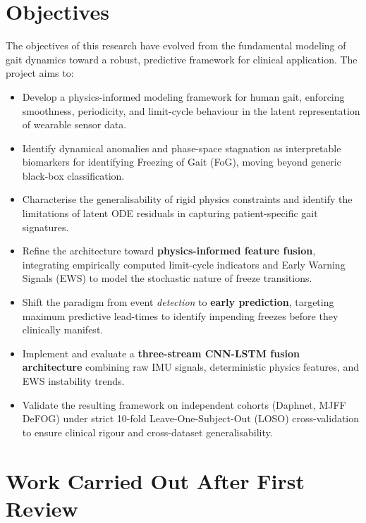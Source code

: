 \documentclass[12pt,a4paper]{article}
\begin{document}
\section*{Objectives}

The objectives of this research have evolved from the fundamental modeling of gait dynamics
toward a robust, predictive framework for clinical application. The project aims to:

\begin{itemize}[leftmargin=*, itemsep=4pt]
  \item Develop a physics-informed modeling framework for human gait, enforcing smoothness,
        periodicity, and limit-cycle behaviour in the latent representation of wearable sensor
        data.
  \item Identify dynamical anomalies and phase-space stagnation as interpretable biomarkers for
        identifying Freezing of Gait (FoG), moving beyond generic black-box classification.
  \item Characterise the generalisability of rigid physics constraints and identify the
        limitations of latent ODE residuals in capturing patient-specific gait signatures.
  \item Refine the architecture toward \textbf{physics-informed feature fusion}, integrating
        empirically computed limit-cycle indicators and Early Warning Signals (EWS) to model
        the stochastic nature of freeze transitions.
  \item Shift the paradigm from event \emph{detection} to \textbf{early prediction}, targeting
        maximum predictive lead-times to identify impending freezes before they clinically
        manifest.
  \item Implement and evaluate a \textbf{three-stream CNN-LSTM fusion architecture} combining
        raw IMU signals, deterministic physics features, and EWS instability trends.
  \item Validate the resulting framework on independent cohorts (Daphnet, MJFF DeFOG) under
        strict 10-fold Leave-One-Subject-Out (LOSO) cross-validation to ensure clinical
        rigour and cross-dataset generalisability.
\end{itemize}

\newpage
\section*{Work Carried Out After First Review}
\end{document}

